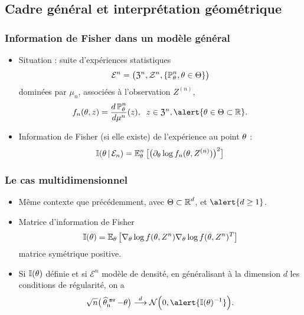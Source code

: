 \subsection{Cadre général et interprétation géométrique}

\begin{frame}
\frametitle{Information de Fisher dans un modèle général}
\begin{df}
\begin{itemize}
\item \alert{Situation} : suite d'expériences statistiques
$${\mathcal E}^n=\big(\mathfrak{Z}^n, {\mathcal Z}^n, \{\operatorname{{\mathbb P}}_\theta^n,\theta \in \Theta\}\big)$$
dominées par $\mu_n$, associées à l'observation $Z^{(n)}$,
$$f_n(\truetheta,z)=\frac{d\PP_\truetheta^n}{d\mu^n}(z),\;\;z\in\mathfrak{Z}^n,\alert{\truetheta \in \Theta \subset \R}.$$
\item \alert{ Information de Fisher} (si elle existe) de l'expérience au point $\theta$ :
$$\mathbb{I}(\theta\,|\,{\mathcal E}_n)=\operatorname{{\mathbb E}}_\theta^n\big[\big(\partial_\theta \log  f_n(\theta, Z^{(n)})\big)^2\big]$$
\end{itemize}
\end{df}
\end{frame}

\begin{frame}
\frametitle{Le cas multidimensionnel}
\begin{itemize}
\item \alert{Même contexte} que précédemment, avec $\Theta \subset \operatorname{{\mathbb R}}^d$, et $\alert{ d \geq 1}$.
\item \alert{ Matrice d'information de Fisher}
$$\mathbb{I}(\theta)= \operatorname{{\mathbb E}}_\theta \big[\nabla_{\theta}\log f(\theta, Z^{n}) \nabla_{\theta}\log f(\theta, Z^{n})^T\big]$$
\alert{matrice symétrique positive}.
\item Si $\mathbb{I}(\theta)$ définie et si ${\mathcal E}^n$ \alert{modèle de densité}, en généralisant à la dimension $d$ les conditions de régularité, on a \alert{}
$$\sqrt{n}\big(\estMV-\truetheta\big) \stackrel{d}{\longrightarrow} {\mathcal N}\Big(0, \alert{\mathbb{I}(\truetheta)^{-1}}\Big).$$
\end{itemize}
\end{frame}


